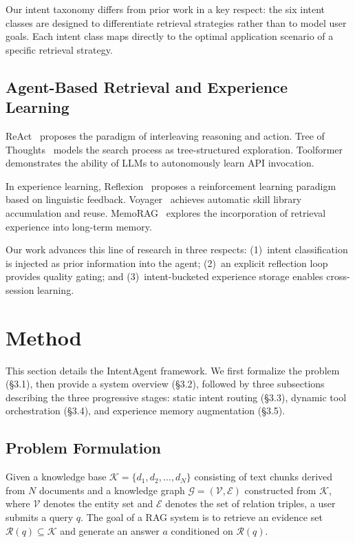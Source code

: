 \documentclass[runningheads]{llncs}
\begin{document}
Our intent taxonomy differs from prior work in a key respect: the six intent classes are designed to differentiate retrieval strategies rather than to model user goals. Each intent class maps directly to the optimal application scenario of a specific retrieval strategy.

\subsection{Agent-Based Retrieval and Experience Learning}

ReAct~\cite{ref13} proposes the paradigm of interleaving reasoning and action. Tree of Thoughts~\cite{ref14} models the search process as tree-structured exploration. Toolformer~\cite{ref15} demonstrates the ability of LLMs to autonomously learn API invocation.

In experience learning, Reflexion~\cite{ref16} proposes a reinforcement learning paradigm based on linguistic feedback. Voyager~\cite{ref17} achieves automatic skill library accumulation and reuse. MemoRAG~\cite{ref18} explores the incorporation of retrieval experience into long-term memory.

Our work advances this line of research in three respects: (1)~intent classification is injected as prior information into the agent; (2)~an explicit reflection loop provides quality gating; and (3)~intent-bucketed experience storage enables cross-session learning.


\section{Method}

This section details the IntentAgent framework. We first formalize the problem (\S3.1), then provide a system overview (\S3.2), followed by three subsections describing the three progressive stages: static intent routing (\S3.3), dynamic tool orchestration (\S3.4), and experience memory augmentation (\S3.5).

\subsection{Problem Formulation}

Given a knowledge base $\mathcal{K} = \{d_1, d_2, \ldots, d_N\}$ consisting of text chunks derived from $N$ documents and a knowledge graph $\mathcal{G} = (\mathcal{V}, \mathcal{E})$ constructed from $\mathcal{K}$, where $\mathcal{V}$ denotes the entity set and $\mathcal{E}$ denotes the set of relation triples, a user submits a query $q$. The goal of a RAG system is to retrieve an evidence set $\mathcal{R}(q) \subseteq \mathcal{K}$ and generate an answer $a$ conditioned on $\mathcal{R}(q)$.
\end{document}
